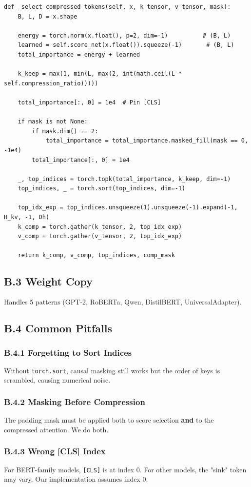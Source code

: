 \begin{lstlisting}
def _select_compressed_tokens(self, x, k_tensor, v_tensor, mask):
    B, L, D = x.shape
    
    energy = torch.norm(x.float(), p=2, dim=-1)          # (B, L)
    learned = self.score_net(x.float()).squeeze(-1)       # (B, L)
    total_importance = energy + learned
    
    k_keep = max(1, min(L, max(2, int(math.ceil(L * self.compression_ratio)))))
    
    total_importance[:, 0] = 1e4  # Pin [CLS]
    
    if mask is not None:
        if mask.dim() == 2:
            total_importance = total_importance.masked_fill(mask == 0, -1e4)
        total_importance[:, 0] = 1e4
    
    _, top_indices = torch.topk(total_importance, k_keep, dim=-1)
    top_indices, _ = torch.sort(top_indices, dim=-1)
    
    top_idx_exp = top_indices.unsqueeze(1).unsqueeze(-1).expand(-1, H_kv, -1, Dh)
    k_comp = torch.gather(k_tensor, 2, top_idx_exp)
    v_comp = torch.gather(v_tensor, 2, top_idx_exp)
    
    return k_comp, v_comp, top_indices, comp_mask
\end{lstlisting}

\subsection{B.3 Weight Copy}

Handles 5 patterns (GPT-2, RoBERTa, Qwen, DistilBERT, UniversalAdapter).

\subsection{B.4 Common Pitfalls}

\subsubsection{B.4.1 Forgetting to Sort Indices}

Without \texttt{torch.sort}, causal masking still works but the order of keys is 
scrambled, causing numerical noise.

\subsubsection{B.4.2 Masking Before Compression}

The padding mask must be applied both to score selection \textbf{and} to the 
compressed attention. We do both.

\subsubsection{B.4.3 Wrong [CLS] Index}

For BERT-family models, \texttt{[CLS]} is at index 0. For other models, the "sink" 
token may vary. Our implementation assumes index 0.

